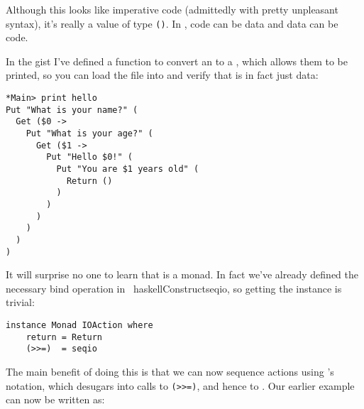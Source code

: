 \documentclass[thesis-solanki.tex]{subfiles}
\begin{document}
Although this looks like imperative code (admittedly with pretty unpleasant syntax), it's really a value of type  \Verb!()!. In ,
code can be data and data can be code.

In the gist
 I've defined a function to convert an  to a , which allows them to be printed, so you can load the file into  
and verify that  is in fact just data:

\begin{code-list}[H]
\begin{singlespace}
\begin{verbatim}
*Main> print hello
Put "What is your name?" (
  Get ($0 -> 
    Put "What is your age?" (
      Get ($1 -> 
        Put "Hello $0!" (
          Put "You are $1 years old" (
            Return ()
          )
        )
      )
    )
  )
)
\end{verbatim}
\end{singlespace}
\caption{}
\label{}
\end{code-list}


It will surprise no one to learn that  is a monad. In fact we've already defined the necessary bind operation in \
haskellConstruct{seqio}, so getting 
the  instance is trivial:

\begin{code-list}[H]
\begin{singlespace}
\begin{verbatim}
instance Monad IOAction where
    return = Return
    (>>=)  = seqio
\end{verbatim}

\end{singlespace}
\caption{}
\label{}
\end{code-list}



The main benefit of doing this is that we can now sequence actions using 's
 notation, which desugars into calls to \Verb!(>>=)!, and 
hence to \haskellConstruct{seqio}. Our earlier \haskellConstruct{hello} example can now be written as:
\par
\end{document}
